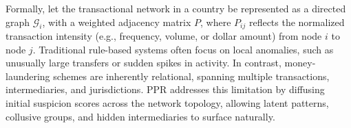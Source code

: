 Formally, let the transactional network in a country be represented as a directed graph $\mathcal{G}_i$, with a weighted adjacency matrix $P$, where $P_{ij}$ reflects the normalized transaction intensity (e.g., frequency, volume, or dollar amount) from node $i$ to node $j$. Traditional rule-based systems often focus on local anomalies, such as unusually large transfers or sudden spikes in activity. In contrast, money-laundering schemes are inherently relational, spanning multiple transactions, intermediaries, and jurisdictions. PPR addresses this limitation by diffusing initial suspicion scores across the network topology, allowing latent patterns, collusive groups, and hidden intermediaries to surface naturally.
